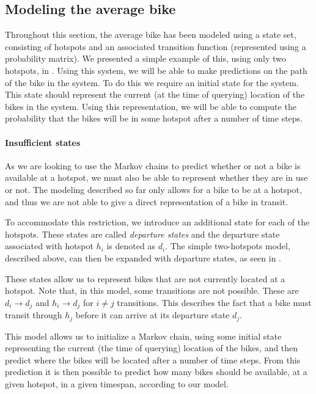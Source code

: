 \subsection{Modeling the average bike}\label{markov:modeling}
Throughout this section, the average bike has been modeled using a state set, consisting of hotspots and an associated transition function (represented using a probability matrix).
We presented a simple example of this, using only two hotspots, in .
Using this system, we will be able to make predictions on the path of the bike in the system.
To do this we require an initial state for the system.
This state should represent the current (at the time of querying) location of the bikes in the system.
Using this representation, we will be able to compute the probability that the bikes will be in some hotspot after a number of time steps.

\paragraph{Insufficient states}
As we are looking to use the Markov chains to predict whether or not a bike is available at a hotspot, we must also be able to represent whether they are in use or not.
The modeling described so far only allows for a bike to be at a hotspot, and thus we are not able to give a direct representation of a bike in transit.

To accommodate this restriction, we introduce an additional state for each of the hotspots.
These states are called \emph{departure states} and the departure state associated with hotspot $h_i$ is denoted as $d_i$.
The simple two-hotspots model, described above, can then be expanded with departure states, as seen in .



These states allow us to represent bikes that are not currently located at a hotspot.
Note that, in this model, some transitions are not possible.
These are $d_i \rightarrow d_j$ and $h_i \rightarrow d_j $ for $i \neq j$ transitions.
This describes the fact that a bike must transit through $h_j$ before it can arrive at its departure state $d_j$.

This model allows us to initialize a Markov chain, using some initial state representing the current (the time of querying) location of the bikes, and then predict where the bikes will be located after a number of time steps.
From this prediction it is then possible to predict how many bikes should be available, at a given hotspot, in a given timespan, according to our model.


